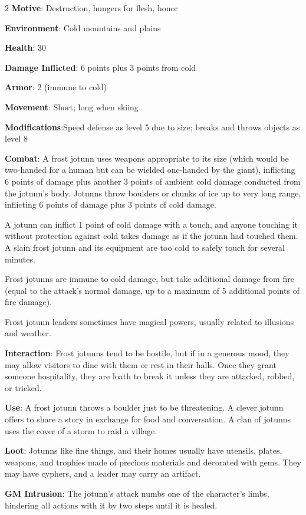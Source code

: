 \begin{multicols}{2}
\textbf{Motive}: Destruction, hungers for flesh, honor 

\textbf{Environment}: Cold mountains and plains 

\textbf{Health}: 30 

\textbf{Damage Inflicted}: 6 points plus 3 points from cold 

\textbf{Armor}: 2 (immune to cold) 

\textbf{Movement}: Short; long when skiing 

\textbf{Modifications}:Speed defense as level 5 due to size; breaks and throws objects as level 8 

\textbf{Combat}: A frost jotunn uses weapons appropriate to its size (which would be two-handed for a human but can be wielded one-handed by the giant), inflicting 6 points of damage plus another 3 points of ambient cold damage conducted from the jotunn’s body. Jotunns throw boulders or chunks of ice up to very long range, inflicting 6 points of damage plus 3 points of cold damage. 

A jotunn can inflict 1 point of cold damage with a touch, and anyone touching it without protection against cold takes damage as if the jotunn had touched them. A slain frost jotunn and its equipment are too cold to safely touch for several minutes. 

Frost jotunns are immune to cold damage, but take additional damage from fire (equal to the attack’s normal damage, up to a maximum of 5 additional points of fire damage). 

Frost jotunn leaders sometimes have magical powers, usually related to illusions and weather. 

\textbf{Interaction}: Frost jotunns tend to be hostile, but if in a generous mood, they may allow visitors to dine with them or rest in their halls. Once they grant someone hospitality, they are loath to break it unless they are attacked, robbed, or tricked. 

\textbf{Use}: A frost jotunn throws a boulder just to be threatening. A clever jotunn offers to share a story in exchange for food and conversation. A clan of jotunns uses the cover of a storm to raid a village. 

\textbf{Loot}: Jotunns like fine things, and their homes usually have utensils, plates, weapons, and trophies made of precious materials and decorated with gems. They may have cyphers, and a leader may carry an artifact.

\textbf{GM Intrusion}: The jotunn’s attack numbs one of the character’s limbs, hindering all actions with it by two steps until it is healed.


\end{multicols}
